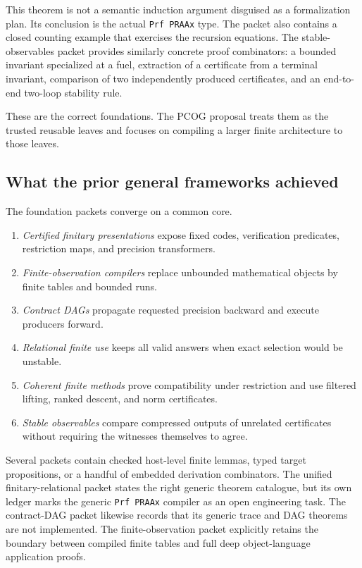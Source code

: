 This theorem is not a semantic induction argument disguised as a formalization
plan.  Its conclusion is the actual \texttt{Prf PRAAx} type.  The packet also
contains a closed counting example that exercises the recursion equations.
The stable-observables packet provides similarly concrete proof combinators:
a bounded invariant specialized at a fuel, extraction of a certificate from a
terminal invariant, comparison of two independently produced certificates,
and an end-to-end two-loop stability rule.

These are the correct foundations.  The PCOG proposal treats them as the
trusted reusable leaves and focuses on compiling a larger finite architecture
to those leaves.

\subsection{What the prior general frameworks achieved}

The foundation packets converge on a common core.

\begin{enumerate}
\item \emph{Certified finitary presentations} expose fixed codes,
verification predicates, restriction maps, and precision transformers.
\item \emph{Finite-observation compilers} replace unbounded mathematical
objects by finite tables and bounded runs.
\item \emph{Contract DAGs} propagate requested precision backward and execute
producers forward.
\item \emph{Relational finite use} keeps all valid answers when exact selection
would be unstable.
\item \emph{Coherent finite methods} prove compatibility under restriction and
use filtered lifting, ranked descent, and norm certificates.
\item \emph{Stable observables} compare compressed outputs of unrelated
certificates without requiring the witnesses themselves to agree.
\end{enumerate}

Several packets contain checked host-level finite lemmas, typed target
propositions, or a handful of embedded derivation combinators.  The unified
finitary-relational packet states the right generic theorem catalogue, but its
own ledger marks the generic \texttt{Prf PRAAx} compiler as an open engineering
task.  The contract-DAG packet likewise records that its generic trace and DAG
theorems are not implemented.  The finite-observation packet explicitly
retains the boundary between compiled finite tables and full deep
object-language application proofs.

